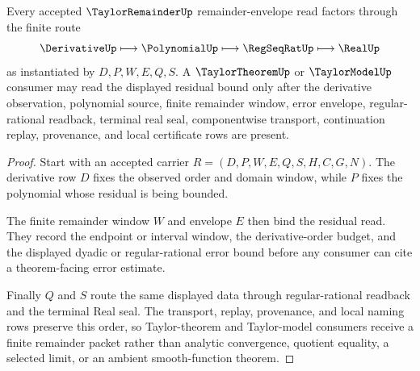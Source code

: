\begin{theorem}
\label{thm:taylor-remainder-real-seal-handoff}
Every accepted $\TaylorRemainderUp$ remainder-envelope read factors through the finite route
$$
\DerivativeUp \longmapsto \PolynomialUp \longmapsto \RegSeqRatUp \longmapsto \RealUp
$$
as instantiated by $D,P,W,E,Q,S$. A $\TaylorTheoremUp$ or $\TaylorModelUp$ consumer may read the displayed residual bound only after the derivative observation, polynomial source, finite remainder window, error envelope, regular-rational readback, terminal real seal, componentwise transport, continuation replay, provenance, and local certificate rows are present.
\end{theorem}
\begin{proof}
Start with an accepted carrier $R=(D,P,W,E,Q,S,H,C,G,N)$. The derivative row $D$ fixes the observed order and domain window, while $P$ fixes the polynomial whose residual is being bounded.

The finite remainder window $W$ and envelope $E$ then bind the residual read. They record the endpoint or interval window, the derivative-order budget, and the displayed dyadic or regular-rational error bound before any consumer can cite a theorem-facing error estimate.

Finally $Q$ and $S$ route the same displayed data through regular-rational readback and the terminal Real seal. The transport, replay, provenance, and local naming rows preserve this order, so Taylor-theorem and Taylor-model consumers receive a finite remainder packet rather than analytic convergence, quotient equality, a selected limit, or an ambient smooth-function theorem.
\end{proof}




